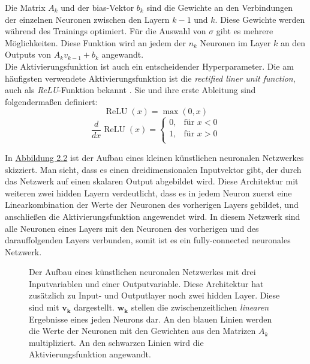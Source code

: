 Die Matrix $A_k$ und der bias-Vektor $b_k$ sind die Gewichte an den Verbindungen der einzelnen Neuronen zwischen den Layern $k-1$ und $k$. 
Diese Gewichte werden w\"ahrend des Trainings optimiert. F\"ur die Auswahl von $\sigma$ gibt es mehrere M\"oglichkeiten. Diese Funktion wird an jedem der
$n_k$ Neuronen im Layer $k$ an den Outputs von $A_k v_{k-1} + b_k$ angewandt. \\

Die Aktivierungsfunktion ist auch ein entscheidender Hyperparameter. Die am h\"aufigsten verwendete Aktivierungsfunktion ist die \textit{rectified liner unit function},
auch als \textit{ReLU}-Funktion bekannt \cite{activation}. Sie und ihre erste Ableitung sind folgenderma{\ss}en definiert:
$$ \operatorname{ReLU}(x) = \max(0,x)$$
$$ \frac{d}{dx}\operatorname{ReLU}(x) =
    \left\{
    \begin{array}{lr}
      0,& \text{für }x < 0 \\
      1,& \text{für }x > 0 \\
    \end{array}
    \right. 
$$


In \hyperref[fig:nn]{Abbildung 2.2} ist der Aufbau eines kleinen k\"unstlichen neuronalen Netzwerkes skizziert. Man sieht, dass es einen dreidimensionalen Inputvektor gibt, der
durch das Netzwerk auf einen skalaren Output abgebildet wird. Diese Architektur mit weiteren zwei hidden Layern verdeutlicht, dass es in jedem Neuron zuerst eine Linearkombination der 
Werte der Neuronen des vorherigen Layers gebildet, und anschlie{\ss}en die Aktivierungsfunktion angewendet wird. In diesem Netzwerk sind alle Neuronen eines Layers mit den Neuronen 
des vorherigen und des darauffolgenden Layers verbunden, somit ist es ein fully-connected neuronales Netzwerk. \\

\begin{figure}[ht]
  \label{fig:nn}
  \begin{center}
  \end{center}
  \caption[K\"unstliches Neuronales Netzwerk]
    {Der Aufbau eines k\"unstlichen neuronalen Netzwerkes mit drei Inputvariablen und einer Outputvariable. Diese Architektur hat zus\"atzlich zu Input- und Outputlayer 
    noch zwei hidden Layer. Diese sind mit $\mathbf{v_k}$ dargestellt. $\mathbf{w_k}$ stellen die zwischenzeitlichen \textit{linearen} Ergebnisse eines jeden Neurons dar. 
    An den blauen Linien werden die Werte der Neuronen mit den Gewichten aus den Matrizen $A_k$ multipliziert. An den schwarzen Linien wird die Aktivierungsfunktion angewandt.}
\end{figure}

